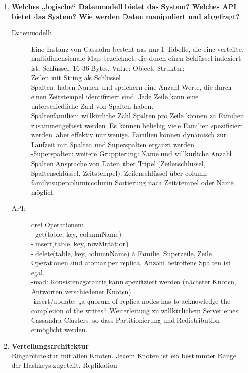 \documentclass[a4paper,10pt,titlepage=false]{scrreprt}
\begin{document}
\begin{enumerate}
\begin{itemize}
  \end{itemize}
\item \textbf{Welches „logische“ Datenmodell bietet das System? Welches API bietet das System? Wie werden Daten manipuliert und abgefragt?}\\
\begin{description}
  \item[Datenmodell:] Eine Instanz von Cassadra besteht aus nur 1 Tabelle, die eine verteilte, multidimensionale Map bezeichnet, die durch einen Schlüssel indexiert ist. Schlüssel: 16-36 Bytes, Value: Object.
Struktur:\\
 Zeilen mit String als Schlüssel\\
Spalten: haben Namen und speichern eine Anzahl Werte, die durch einen Zeitstempel identifiziert sind. Jede Zeile kann eine unterschiedliche Zahl von Spalten haben.\\
 Spaltenfamilien: willkürliche Zahl Spalten pro Zeile können zu Familien zusammengefasst werden. Es können beliebig viele Familien spezifiziert werden, aber effektiv nur wenige. Familien können dynamisch zur Laufzeit mit Spalten und Superspalten ergänzt werden.\\
-Superspalten: weitere Gruppierung: Name und willkürliche Anzahl Spalten
Ansprache von Daten über Tripel (Zeilenschlüssel, Spaltenschlüssel, Zeitstempel). Zeilenschlüssel über column-family:supercolumn:column
Sortierung nach Zeitstempel oder Name möglich
\item[API:] drei Operationen:\\
- get(table, key, columnName)\\
- insert(table, key, rowMutation)\\
- delete(table, key, columnName) à Familie, Superzeile, Zeile\\
Operationen sind atomar per replica, Anzahl betroffene Spalten ist egal.\\
-read: Konsistenzgarantie kann spezifiziert werden (nächster Knoten, Antworten verschiedener Knoten)\\
-insert/update: „a quorum of replica nodes has to acknowledge the completion of the writes“. Weiterleitung zu willkürlichem Server eines Cassandra Clusters, so dass Partitionierung und Redistribution ermöglicht werden. 
\end{description}
\item \textbf{Verteilungsarchitektur}\\
Ringarchitektur mit allen Knoten. Jedem Knoten ist ein bestimmter Range der Hashkeys zugeteilt.
Replikation\\

\end{enumerate}
\end{document}

